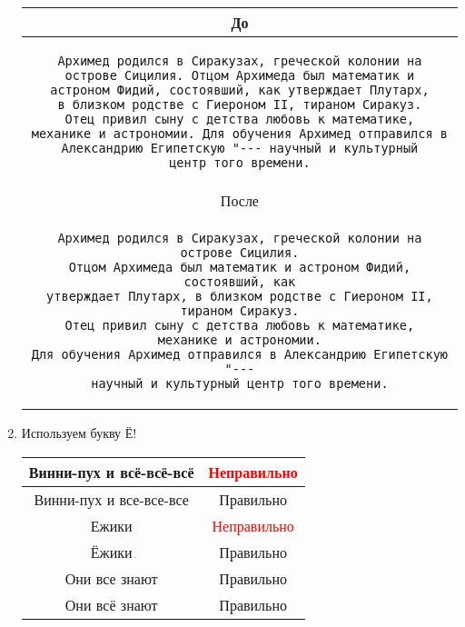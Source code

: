 \documentclass[12pt,a4paper]{book}
\newcommand{\ok}{& \textcolor{green!60!black}{Правильно}}
\newcommand{\bad}{& \textcolor{red}{Неправильно}}
\begin{document}
\begin{enumerate}
	\begin{center}\begin{tabular}{|c|}
	\hline
	До \\
	\hline
	\begin{minipage}{0.9\textwidth}
		\begin{verbatim}
Архимед родился в Сиракузах, греческой колонии на
острове Сицилия. Отцом Архимеда был математик и
астроном Фидий, состоявший, как утверждает Плутарх,
в близком родстве с Гиероном II, тираном Сиракуз.
Отец привил сыну с детства любовь к математике,
механике и астрономии. Для обучения Архимед отправился в
Александрию Египетскую "--- научный и культурный
центр того времени.
\end{verbatim}
	\end{minipage}
	\\
	\hline После \\
	\hline
	\begin{minipage}{0.9\textwidth}
		\begin{verbatim}
Архимед родился в Сиракузах, греческой колонии на острове Сицилия.
Отцом Архимеда был математик и астроном Фидий, состоявший, как
утверждает Плутарх, в близком родстве с Гиероном II, тираном Сиракуз.
Отец привил сыну с детства любовь к математике,
механике и астрономии.
Для обучения Архимед отправился в Александрию Египетскую "---
научный и культурный центр того времени.
\end{verbatim}
	\end{minipage} \\
	\hline
	\end{tabular}\end{center}

\item Используем букву Ё!
	\begin{center}\begin{tabular}{|c|c|}
		\hline Винни-пух и всё-всё-всё \bad \\
		\hline Винни-пух и все-все-все \ok \\
		\hline Ежики \bad \\
		\hline Ёжики \ok \\
		\hline Они все знают \ok \\
		\hline Они всё знают \ok \\
		\hline
	\end{tabular}\end{center}


\end{enumerate}
\end{document}
